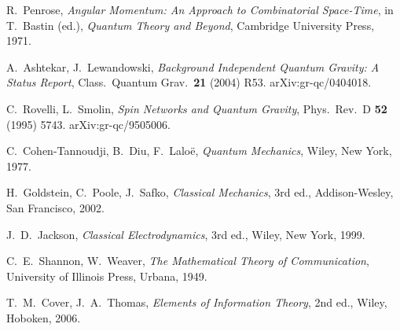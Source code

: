 \documentclass[11pt,a4paper]{article}
\theoremstyle{definition}
\theoremstyle{plain}
\theoremstyle{remark}
\begin{document}
\begin{thebibliography}{99}
R.~Penrose, \emph{Angular Momentum: An Approach to Combinatorial Space-Time}, in T.~Bastin (ed.), \textit{Quantum Theory and Beyond}, Cambridge University Press, 1971.

A.~Ashtekar, J.~Lewandowski, \emph{Background Independent Quantum Gravity: A Status Report}, Class.\ Quantum Grav.\ \textbf{21} (2004) R53. arXiv:gr-qc/0404018.

C.~Rovelli, L.~Smolin, \emph{Spin Networks and Quantum Gravity}, Phys.\ Rev.\ D \textbf{52} (1995) 5743. arXiv:gr-qc/9505006.

C.~Cohen-Tannoudji, B.~Diu, F.~Lalo\"{e}, \emph{Quantum Mechanics}, Wiley, New York, 1977.

H.~Goldstein, C.~Poole, J.~Safko, \emph{Classical Mechanics}, 3rd ed., Addison-Wesley, San Francisco, 2002.

J.~D.~Jackson, \emph{Classical Electrodynamics}, 3rd ed., Wiley, New York, 1999.

C.~E.~Shannon, W.~Weaver, \emph{The Mathematical Theory of Communication}, University of Illinois Press, Urbana, 1949.

T.~M.~Cover, J.~A.~Thomas, \emph{Elements of Information Theory}, 2nd ed., Wiley, Hoboken, 2006.

\end{thebibliography}

\end{document}
